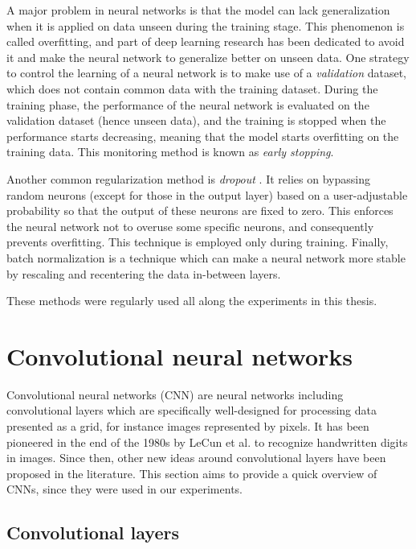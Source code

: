 A major problem in neural networks is that the model can lack generalization when it is applied on data unseen during the training stage. This phenomenon is called overfitting, and part of deep learning research has been dedicated to avoid it and make the neural network to generalize better on unseen data. One strategy to control the learning of a neural network is to make use of a \textit{validation} dataset, which does not contain common data with the training dataset. During the training phase, the performance of the neural network is evaluated on the validation dataset (hence unseen data), and the training is stopped when the performance starts decreasing, meaning that the model starts overfitting on the training data. This monitoring method is known as \textit{early stopping}.

Another common regularization method is \textit{dropout} \cite{srivastava_dropout_2014}. It relies on bypassing random neurons (except for those in the output layer) based on a user-adjustable probability so that the output of these neurons are fixed to zero. This enforces the neural network not to overuse some specific neurons, and consequently prevents overfitting. This technique is employed only during training. Finally, batch normalization is a technique which can make a neural network more stable by rescaling and recentering the data in-between layers.

These methods were regularly used all along the experiments in this thesis.

\section{Convolutional neural networks}
\label{sec:cnn}

Convolutional neural networks (CNN) are neural networks including convolutional layers which are specifically well-designed for processing data presented as a grid, for instance images represented by pixels. It has been pioneered in the end of the 1980s by LeCun et al. \cite{lecun_backpropagation_1989} to recognize handwritten digits in images. Since then, other new ideas around convolutional layers have been proposed in the literature. This section aims to provide a quick overview of CNNs, since they were used in our experiments.

\subsection{Convolutional layers}

